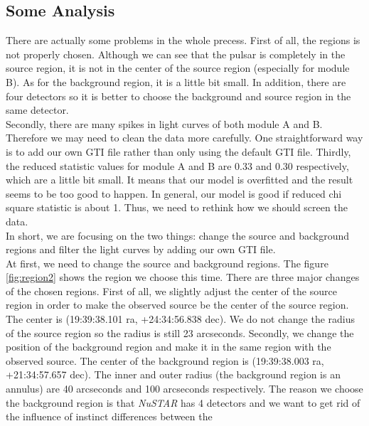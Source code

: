 \documentclass[12pt]{report}
\begin{document}
        \subsection*{Some Analysis}
        \indent There are actually some problems in the whole precess. First of all, the regions is not properly 
        chosen. Although we can see that the pulsar is completely in the source region, it is not in the center of 
        the source region (especially for module B). As for the background region, it is a little bit small. 
        In addition, there are four 
        detectors so it is better to choose the background and source region in the same detector. \\
        \indent Secondly, there are many spikes in light curves of both module A and B. 
        Therefore we may need to clean the data
        more carefully. One straightforward way is to add our own GTI file rather than only using the default GTI 
        file. Thirdly, the reduced statistic values for module A and B are 0.33 and 0.30 respectively, which are 
        a little bit small. It means that our model is overfitted and the result seems to be too good to happen. In 
        general, our model is good if reduced chi square statistic is about 1. Thus, we need to rethink how we 
        should screen the data.\\
        \indent 
        In short, we are focusing on the two things: change the source and background regions and filter the 
        light curves by adding our own GTI file. \\
        \indent
        At first, we need to change the source and background regions. The figure \ref{fig:region2} shows the 
        region we choose this time. There are three major changes of the chosen regions. First of all, we slightly 
        adjust the center of the source region in order to make the observed source be the center of the source 
        region. The center is (19:39:38.101 ra, +24:34:56.838 dec). 
        We do not change the radius of the source region so the radius is still 23 arcseconds. Secondly, we change 
        the
        position of the background region and make it in the same region with the observed source. The center of the 
        background region is (19:39:38.003 ra, +21:34:57.657 dec). The inner and outer radius (the background region
        is an annulus) are 40 arcseconds and 100 arcseconds respectively. 
        The reason we choose the background region is that  
        \textit{NuSTAR} has 4 detectors and we want to get rid of the influence of instinct differences between the 
\end{document}
